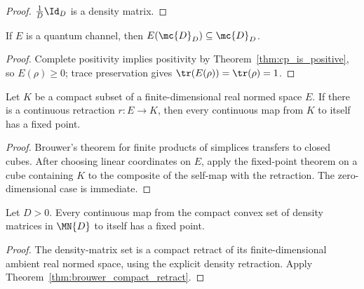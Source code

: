 \begin{proof}\leanok
    $\frac{1}{D}\Id_D$ is a density matrix.
\end{proof}

\begin{theorem}\label{thm:channel_preserves_density}
    \leanok
    If $E$ is a quantum channel, then
    $E(\mc{D}_D) \subseteq \mc{D}_D$.
\end{theorem}

\begin{proof}\leanok{}
    Complete positivity implies positivity by
    Theorem~\ref{thm:cp_is_positive}, so $E(\rho) \ge 0$; trace preservation
    gives $\tr(E(\rho)) = \tr(\rho) = 1$.
\end{proof}

\begin{theorem}%
    \label{thm:brouwer_compact_retract}
    \leanok
    Let $K$ be a compact subset of a finite-dimensional real normed space
    $E$. If there is a continuous retraction $r\colon E\to K$, then every
    continuous map from $K$ to itself has a fixed point.
\end{theorem}

\begin{proof}
    \leanok
    Brouwer's theorem for finite products of simplices transfers to closed
    cubes. After choosing linear coordinates on $E$, apply the fixed-point
    theorem on a cube containing $K$ to the composite of the self-map with
    the retraction. The zero-dimensional case is immediate.
\end{proof}

\begin{theorem}%
    \label{thm:brouwer_density_matrices}
    \leanok
    Let $D > 0$. Every continuous map from the compact convex set of
    density matrices in $\MN{D}$ to itself has a fixed point.
\end{theorem}

\begin{proof}
    \leanok
    The density-matrix set is a compact retract of its finite-dimensional
    ambient real normed space, using the explicit density retraction. Apply
    Theorem~\ref{thm:brouwer_compact_retract}.
\end{proof}

